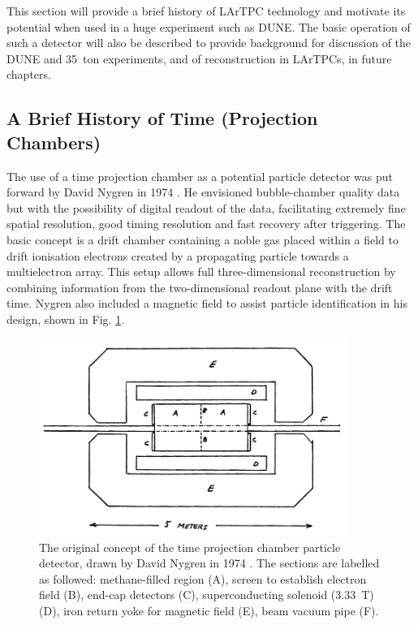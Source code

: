 This section will provide a brief history of LArTPC technology and motivate its potential when used in a huge experiment such as DUNE.  The basic operation of such a detector will also be described to provide background for discussion of the DUNE and 35~ton experiments, and of reconstruction in LArTPCs, in future chapters.

\subsection{A Brief History of Time (Projection Chambers)}\label{sec:LArTPCHistory}

The use of a time projection chamber as a potential particle detector was put forward by David Nygren in 1974 \cite{Nygren1974}.  He envisioned bubble-chamber quality data but with the possibility of digital readout of the data, facilitating extremely fine spatial resolution, good timing resolution and fast recovery after triggering.  The basic concept is a drift chamber containing a noble gas placed within a field to drift ionisation electrons created by a propagating particle towards a multielectron array.  This setup allows full three-dimensional reconstruction by combining information from the two-dimensional readout plane with the drift time.  Nygren also included a magnetic field to assist particle identification in his design, shown in Fig. \ref{fig:NygrenTPC}.

\begin{figure}
  \centering
  \includegraphics[width=10cm]{NygrenTPC.png}
  \caption[Original TPC design, Nygren (1974)]{The original concept of the time projection chamber particle detector, drawn by David Nygren in 1974 \cite{Nygren1974}.  The sections are labelled as followed: methane-filled region (A), screen to establish electron field (B), end-cap detectors (C), superconducting solenoid (3.33~T) (D), iron return yoke for magnetic field (E), beam vacuum pipe (F).}
  \label{fig:NygrenTPC}
\end{figure}

